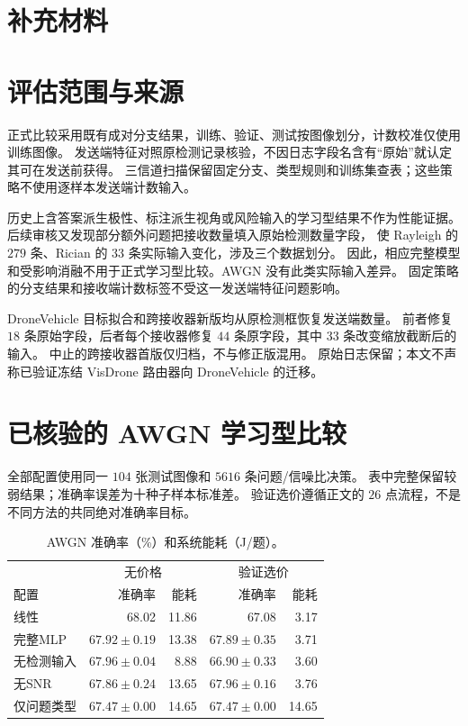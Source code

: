 \section*{补充材料}
\section{评估范围与来源}
正式比较采用既有成对分支结果，训练、验证、测试按图像划分，计数校准仅使用训练图像。
发送端特征对照原检测记录核验，不因日志字段名含有“原始”就认定其可在发送前获得。
三信道扫描保留固定分支、类型规则和训练集查表；这些策略不使用逐样本发送端计数输入。

历史上含答案派生极性、标注派生视角或风险输入的学习型结果不作为性能证据。
后续审核又发现部分额外问题把接收数量填入原始检测数量字段，
使 Rayleigh 的 $279$ 条、Rician 的 $33$ 条实际输入变化，涉及三个数据划分。
因此，相应完整模型和受影响消融不用于正式学习型比较。AWGN 没有此类实际输入差异。
固定策略的分支结果和接收端计数标签不受这一发送端特征问题影响。

DroneVehicle 目标拟合和跨接收器新版均从原检测框恢复发送端数量。
前者修复 $18$ 条原始字段，后者每个接收器修复 $44$ 条原字段，其中 $33$ 条改变缩放截断后的输入。
中止的跨接收器首版仅归档，不与修正版混用。
原始日志保留；本文不声称已验证冻结 VisDrone 路由器向 DroneVehicle 的迁移。

\section{已核验的 AWGN 学习型比较}
全部配置使用同一 $104$ 张测试图像和 $5616$ 条问题/信噪比决策。
表中完整保留较弱结果；准确率误差为十种子样本标准差。
验证选价遵循正文的 $26$ 点流程，不是不同方法的共同绝对准确率目标。
\begin{table}[ht]\centering\small
\caption{AWGN 准确率（\%）和系统能耗（J/题）。}
\begin{tabular}{lrrrr}\toprule
 & \multicolumn{2}{c}{无价格} & \multicolumn{2}{c}{验证选价}\\
配置 & 准确率 & 能耗 & 准确率 & 能耗\\\midrule
线性 & 68.02 & 11.86 & 67.08 & 3.17\\
完整MLP & $67.92\pm0.19$ & 13.38 & $67.89\pm0.35$ & 3.71\\
无检测输入 & $67.96\pm0.04$ & 8.88 & $66.90\pm0.33$ & 3.60\\
无SNR & $67.86\pm0.24$ & 13.65 & $67.96\pm0.16$ & 3.76\\
仅问题类型 & $67.47\pm0.00$ & 14.65 & $67.47\pm0.00$ & 14.65\\
\bottomrule\end{tabular}
\end{table}

